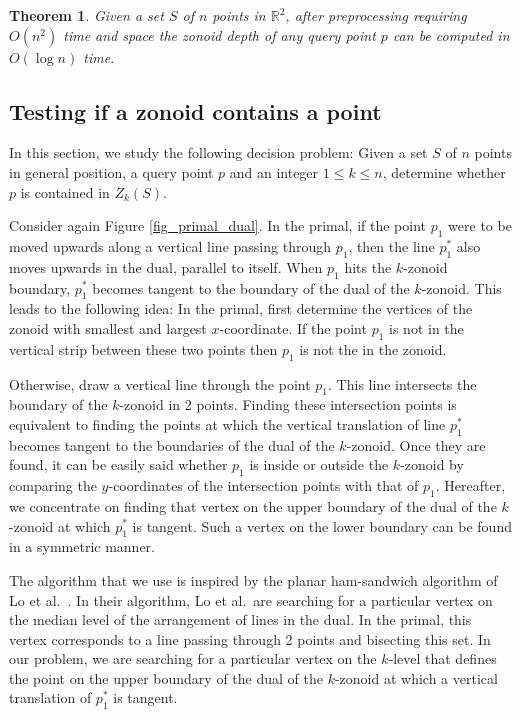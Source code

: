 \documentclass{elsart}
\newtheorem{theorem}{Theorem}
\begin{document}
\begin{theorem}\label{theorem_point_location}
Given a set $S$ of $n$ points in $\mathbb{R}^2$,
after preprocessing requiring $O(n^2)$ time and space the zonoid
depth of any query point $p$ can be computed in $O(\log n)$ time.
\end{theorem}

\subsection{Testing if a zonoid contains a point}
\label{subsection_testing_if_a_zonoid_contains_a_point}

In this section, we study the following decision problem: Given a set
$S$ of $n$ points in general position, a query point $p$ and an
integer $1 \le k \le n$, determine whether $p$ is contained in
$Z_k(S)$. 

Consider again Figure \ref{fig_primal_dual}. In the primal, if the
point $p_1$ were to be moved upwards along a vertical line passing
through $p_1$, then the line $p_1^*$ also moves upwards in the dual,
parallel to itself. When $p_1$ hits the $k$-zonoid boundary, $p_1^*$
becomes tangent to the boundary of the dual of the $k$-zonoid. This
leads to the following idea: In the primal, first determine the
vertices of the zonoid with smallest and largest $x$-coordinate.  If
the point $p_1$ is not in the vertical strip between these two points
then $p_1$ is not the in the zonoid.

Otherwise, draw a vertical line through the point $p_1$. This line
intersects the boundary of the $k$-zonoid in 2 points.  Finding these
intersection points is equivalent to finding the points at which the
vertical translation of line $p_1^*$ becomes tangent to the boundaries
of the dual of the $k$-zonoid. Once they are found, it can be easily
said whether $p_1$ is inside or outside the $k$-zonoid by comparing
the $y$-coordinates of the intersection points with that of  $p_1$.
Hereafter, we concentrate on finding that vertex on the upper boundary
of the dual of the $k$-zonoid at which $p_1^*$ is tangent. Such a
vertex on the lower boundary can be found in a symmetric manner. 

The algorithm that we use is inspired by the planar ham-sandwich
algorithm of Lo et al.\ \cite{algorithms_for_ham_sandwich_cuts}. In
their algorithm, Lo et al.\ are searching for a particular vertex on
the median level of the arrangement of lines in the dual. In the
primal, this vertex corresponds to a line passing through 2 points and
bisecting this set. In our problem, we are searching for a particular
vertex on the $k$-level that defines the point on the upper boundary
of the dual of the $k$-zonoid at which a vertical translation of
$p_1^*$ is tangent.
\end{document}
